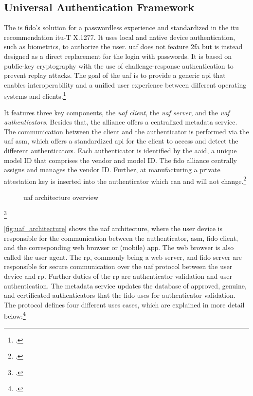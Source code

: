 \subsection{Universal Authentication Framework}

The  is \gls{fido}'s solution for a passwordless experience and standardized in the \gls{itu} recommendation \gls{itu}-T X.1277. It uses local and native device authentication, such as biometrics, to authorize the user. \gls{uaf} does not feature \gls{2fa} but is instead designed as a direct replacement for the login with passwords. It is based on public-key cryptography with the use of challenge-response authentication to prevent replay attacks. The goal of the \gls{uaf} is to provide a generic \gls{api} that enables interoperability and a unified user experience between different operating systems and clients.\footcites[See][249]{Schwartz2018}[See][197--198]{dasgupta2017multi}[See][]{itu-uaf}

It features three key components, the \textit{\gls{uaf} client}, the \textit{\gls{uaf} server}, and the \textit{\gls{uaf} authenticators}. Besides that, the alliance offers a centralized metadata service. The communication between the client and the authenticator is performed via the \gls{uaf} \gls{asm}, which offers a standardized \gls{api} for the client to access and detect the different authenticators. Each authenticator is identified by the \gls{aaid}, a unique model ID that comprises the vendor and model ID. The \gls{fido} alliance centrally assigns and manages the vendor ID. Further, at manufacturing a private attestation key is inserted into the authenticator which can and will not change.\footcites[See][145]{10.1007/978-3-319-26502-5_10}[See][8]{uaf-protocol}

\begin{figure}[hbt]
	\centering
	
	\caption[\gls{uaf} architecture overview]{\gls{uaf} architecture overview\footnotemark}
	\label{fig:uaf_architecture}
\end{figure}
\footcitetext[Source: diagram by author, based on][4]{uaf-overview}

\autoref{fig:uaf_architecture} shows the \gls{uaf} architecture, where the user device is responsible for the communication between the authenticator, \gls{asm}, \gls{fido} client, and the corresponding web browser or (mobile) app. The web browser is also called the user agent. The \gls{rp}, commonly being a web server, and \gls{fido} server are responsible for secure communication over the \gls{uaf} protocol between the user device and \gls{rp}. Further duties of the \gls{rp} are authenticator validation and user authentication. The metadata service updates the database of approved, genuine, and certificated authenticators that the \gls{fido} uses for authenticator validation. The protocol defines four different uses cases, which are explained in more detail below:\footcites[See][4]{uaf-protocol}

